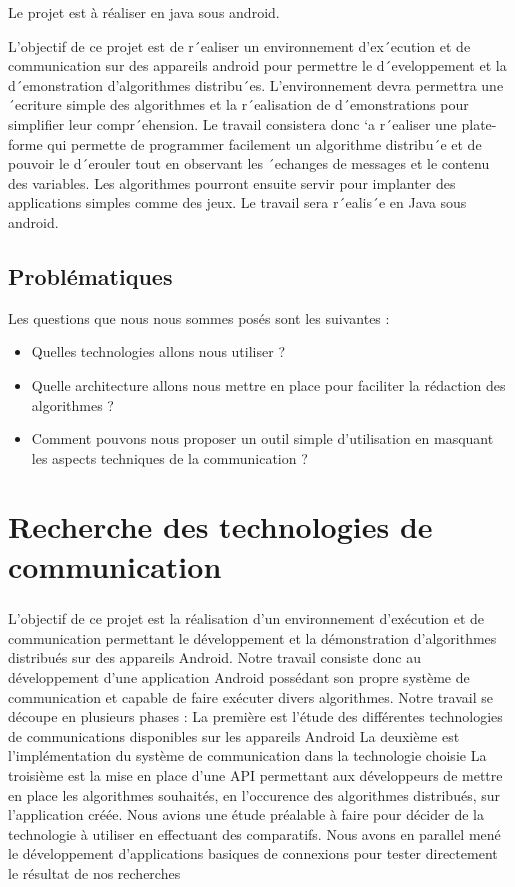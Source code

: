 \documentclass[a4paper,10pt]{report}
\begin{document}
  Le projet est à réaliser en java sous android.
  
  
  
  L’objectif de ce projet est de r´ealiser un environnement d’ex´ecution et de communication
  sur des appareils android pour permettre le d´eveloppement et la d´emonstration
  d’algorithmes distribu´es. L’environnement devra permettra une ´ecriture simple des algorithmes
  et la r´ealisation de d´emonstrations pour simplifier leur compr´ehension. Le travail
  consistera donc `a r´ealiser une plate-forme qui permette de programmer facilement un algorithme
  distribu´e et de pouvoir le d´erouler tout en observant les ´echanges de messages et
  le contenu des variables.
  Les algorithmes pourront ensuite servir pour implanter des applications simples comme
  des jeux. Le travail sera r´ealis´e en Java sous android.
  
  \section{Problématiques}
  Les questions que nous nous sommes posés sont les suivantes : 
  \begin{itemize}
    \item Quelles technologies allons nous utiliser ?
    \item Quelle architecture allons nous mettre en place pour faciliter la rédaction des algorithmes ?
    \item Comment pouvons nous proposer un outil simple d'utilisation en masquant les aspects techniques de la communication ?
  \end{itemize}
\chapter{Recherche des technologies de communication}
  \paragraph{}
  L'objectif de ce projet est la réalisation d'un environnement d'exécution et de communication permettant le développement et la démonstration d'algorithmes distribués sur des appareils Android. Notre travail consiste donc au développement d'une application Android possédant son propre système de communication et capable de faire exécuter divers algorithmes.
  Notre travail se découpe en plusieurs phases :
  La première est l'étude des différentes technologies de communications disponibles sur les appareils Android
  La deuxième est l'implémentation du système de communication dans la technologie choisie
  La troisième est la mise en place d'une API permettant aux développeurs de mettre en place les algorithmes souhaités, en l'occurence des algorithmes distribués, sur l'application créée.
  Nous avions une étude préalable à faire pour décider de la technologie à utiliser en effectuant des comparatifs.
  Nous avons en parallel mené le développement d'applications basiques de connexions pour tester directement le résultat de nos recherches
\end{document}
